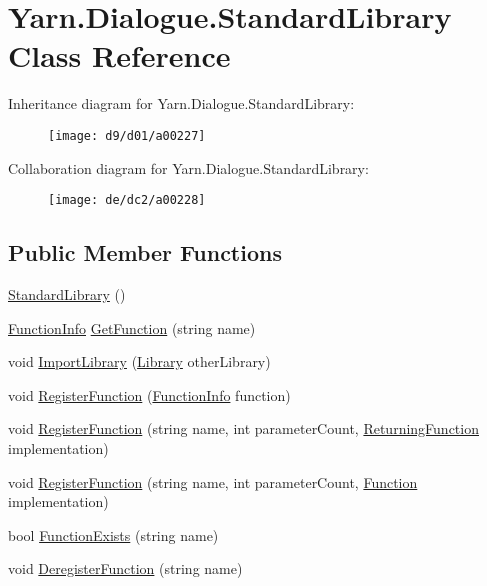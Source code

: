 \hypertarget{a00074}{\section{Yarn.\-Dialogue.\-Standard\-Library Class Reference}
\label{a00074}
}


Inheritance diagram for Yarn.\-Dialogue.\-Standard\-Library\-:
\nopagebreak
\begin{figure}[H]
\begin{center}
\leavevmode
\texttt{[image: d9/d01/a00227]}
\end{center}
\end{figure}


Collaboration diagram for Yarn.\-Dialogue.\-Standard\-Library\-:
\nopagebreak
\begin{figure}[H]
\begin{center}
\leavevmode
\texttt{[image: de/dc2/a00228]}
\end{center}
\end{figure}
\subsection*{Public Member Functions}
\begin{DoxyCompactItemize}
\item 
\hyperlink{a00074_a1bf2ea2b59a842bafffec78667a86b19}{Standard\-Library} ()
\item 
\hyperlink{a00041}{Function\-Info} \hyperlink{a00049_aacfb1f00ad8aa3921941b8d8af0960e0}{Get\-Function} (string name)
\item 
void \hyperlink{a00049_ab42a4fd30a72156cafa685f959deef78}{Import\-Library} (\hyperlink{a00049}{Library} other\-Library)
\item 
void \hyperlink{a00049_a001ab29d21fe7db10fc9c250914287f9}{Register\-Function} (\hyperlink{a00041}{Function\-Info} function)
\item 
void \hyperlink{a00049_a2a698de0b528b2bac17bd85f57d45d4b}{Register\-Function} (string name, int parameter\-Count, \hyperlink{a00026_a5177bf74fbfe7303fac9d8236c2e514b}{Returning\-Function} implementation)
\item 
void \hyperlink{a00049_a6820eaa082077f16496effbc9041b7ad}{Register\-Function} (string name, int parameter\-Count, \hyperlink{a00026_ae0be2e5cf13d5779816102439e61ff1a}{Function} implementation)
\item 
bool \hyperlink{a00049_a6c9a1cc3e25b6aae25e210d8a0d68c09}{Function\-Exists} (string name)
\item 
void \hyperlink{a00049_a47d1b3664733207d5cda15f4a4a7af7a}{Deregister\-Function} (string name)
\end{DoxyCompactItemize}


